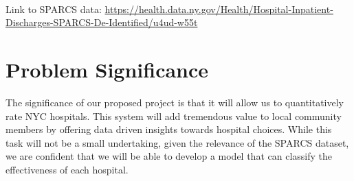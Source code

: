 \documentclass{article}
\begin{document}
\paragraph{} Link to SPARCS data: \href{url}{https://health.data.ny.gov/Health/Hospital-Inpatient-Discharges-SPARCS-De-Identified/u4ud-w55t}


 \section{Problem Significance}
 
  The significance of our proposed project is that it will allow us to quantitatively rate NYC hospitals. This system will add tremendous value to local community members by offering data driven insights towards hospital choices. While this task will not be a small undertaking, given the relevance of the SPARCS dataset, we are confident that we will be able to develop a model that can classify the effectiveness of each hospital. 

  
\end{document}

